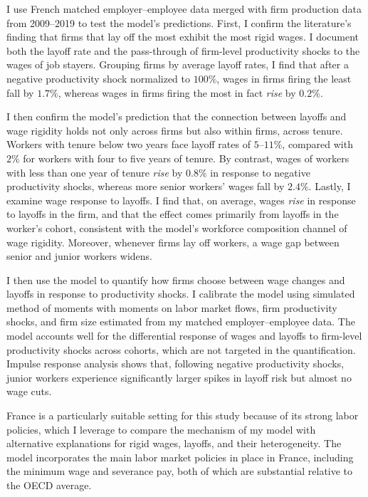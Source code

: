 I use French matched employer–employee data merged with firm production data from 2009–2019 to test the model's predictions. First, I confirm the literature’s finding \parencite{enrlich2024} that firms that lay off the most exhibit the most rigid wages. I document both the layoff rate and the pass-through of firm-level productivity shocks to the wages of job stayers. Grouping firms by average layoff rates, I find that after a negative productivity shock normalized to $100\%$, wages in firms firing the least fall by $1.7\%$, whereas wages in firms firing the most in fact \emph{rise} by $0.2\%$.

I then confirm the model's prediction that the connection between layoffs and wage rigidity holds not only across firms but also within firms, across tenure. Workers with tenure below two years face layoff rates of $5$--$11\%$, compared with $2\%$ for workers with four to five years of tenure. By contrast, wages of workers with less than one year of tenure \emph{rise} by $0.8\%$ in response to negative productivity shocks, whereas more senior workers’ wages fall by $2.4\%$. Lastly, I examine wage response to layoffs. I find that, on average, wages \emph{rise} in response to layoffs in the firm, and that the effect comes primarily from layoffs in the worker's cohort, consistent with the model's workforce composition channel of wage rigidity. Moreover, whenever firms lay off workers, a wage gap between senior and junior workers widens.

I then use the model to quantify how firms choose between wage changes and layoffs in response to productivity shocks. I calibrate the model using simulated method of moments with moments on labor market flows, firm productivity shocks, and firm size estimated from my matched employer–employee data. The model accounts well for the differential response of wages and layoffs to firm-level productivity shocks across cohorts, which are not targeted in the quantification. Impulse response analysis shows that, following negative productivity shocks, junior workers experience significantly larger spikes in layoff risk but almost no wage cuts.

France is a particularly suitable setting for this study because of its strong labor policies, which I leverage to compare the mechanism of my model with alternative explanations for rigid wages, layoffs, and their heterogeneity. The model incorporates the main labor market policies in place in France, including the minimum wage and severance pay, both of which are substantial relative to the OECD average.

